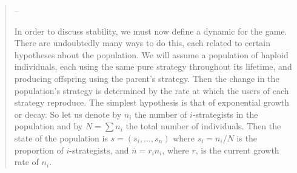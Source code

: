 \documentclass[a4paper,10pt]{article}
\begin{document}
\begin{quotation}
    --
    
    In order to discuss stability, we must now define a dynamic for the game. 
    There are undoubtedly many ways to do this, each related to certain hypotheses about the population.
    We will assume a population of haploid individuals, each using the same pure strategy throughout its lifetime, and producing offspring using the parent’s strategy. 
    Then the change in the population's strategy is determined by the rate at which the users of each strategy reproduce.
    The simplest hypothesis is that of exponential growth or decay. 
    So let us denote by $n_i$ the number of $i$-strategists in the population and by $N=\sum n_i$ the total number of individuals.
    Then the state of the population is $s=(s_i,\dots,s_n)$ where $s_i = n_i/N$ is the proportion of $i$-strategists, and $ \overset{.}{n} = r_in_i$, where $r$, is the current growth rate of $n_i$. 
    
    
\end{quotation}


{\footnotesize


}
\end{document}
